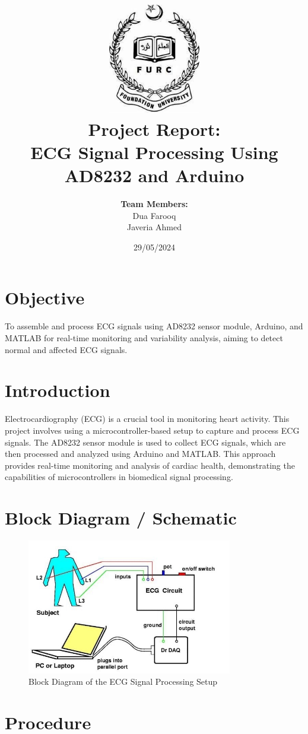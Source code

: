 \documentclass[12pt]{article}
\title{
    \vspace{-2cm}
    \includegraphics[width=0.3\textwidth]{logo.png}\\ %
    \vspace{1cm}
    \textbf{Project Report:}\\
    \textbf{ECG Signal Processing Using AD8232 and Arduino}
}
\author{
    \textbf{Team Members:} \\
    Dua Farooq \\
    Javeria Ahmed
}
\date{29/05/2024}
\begin{document}
\maketitle
\newpage

\tableofcontents
\newpage

\section{Objective}
To assemble and process ECG signals using AD8232 sensor module, Arduino, and MATLAB for real-time monitoring and variability analysis, aiming to detect normal and affected ECG signals.

\section{Introduction}
Electrocardiography (ECG) is a crucial tool in monitoring heart activity. This project involves using a microcontroller-based setup to capture and process ECG signals. The AD8232 sensor module is used to collect ECG signals, which are then processed and analyzed using Arduino and MATLAB. This approach provides real-time monitoring and analysis of cardiac health, demonstrating the capabilities of microcontrollers in biomedical signal processing.

\section{Block Diagram / Schematic}
\begin{figure}[h!]
    \centering
    \includegraphics[width=0.8\textwidth]{schematic.jpeg}
    \caption{Block Diagram of the ECG Signal Processing Setup}
    \label{fig:block_diagram}
\end{figure}

\section{Procedure}
\end{document}
